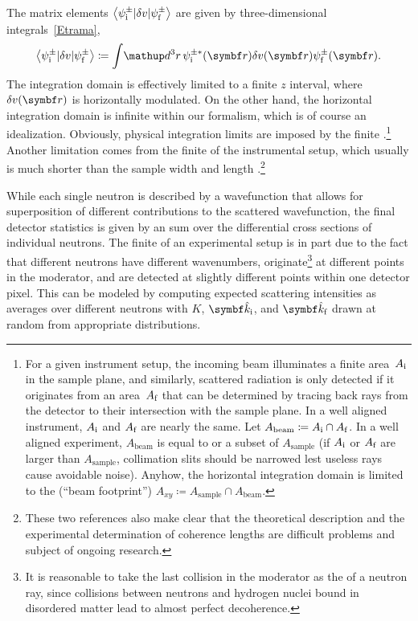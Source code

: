 %
The matrix elements $\left\langle \psi^\pm_{\text{i}}|\delta v|\psi^\pm_{\text{f}}\right\rangle$
are given by three-dimensional integrals~\cref{Etrama},
\begin{equation}\label{Etrama3}
  \bra \psi_\ti^\pm|\delta v|\psi_\tf^\pm\ket
  \coloneqq  \int\!\d^3r\, \psi^{\pm*}_\ti(\r)\delta v(\r)\psi^\pm_\tf(\r).
\end{equation}
The integration domain is effectively limited to a finite $z$ interval,
where $\delta v(\r)$ is horizontally modulated.
On the other hand, the horizontal integration domain is infinite
within our formalism,
which is of course an idealization.
Obviously, physical integration limits are imposed by the finite
.\footnote
{For a given instrument setup,
the incoming beam illuminates a finite area~$A_{\text{i}}$ in the sample plane,
and similarly, scattered radiation is only detected if it originates
from an area~$A_{\text{f}}$ that can be determined
by tracing back rays from the detector
to their intersection with the sample plane.
In a well aligned instrument, $A_{\text{i}}$ and $A_{\text{f}}$ are nearly the same.
Let $A_\text{beam}\coloneqq A_{\text{i}}\cap A_{\text{f}}$.
In a well aligned experiment,
$A_\text{beam}$ is equal to or a subset of $A_\text{sample}$
(if $A_{\text{i}}$ or $A_{\text{f}}$ are larger than $A_\text{sample}$,
collimation slits should be narrowed
lest useless rays cause avoidable noise).
Anyhow, the horizontal integration domain
is limited to the  (``beam footprint'')
$A_{xy}\coloneqq A_\text{sample}\cap A_\text{beam}$.}
%
%
%
Another limitation comes from the finite 
of the instrumental setup,
which usually is much shorter than the sample width and length
\cite{HaPR10,MaMM14}.\footnote
{These two references also make clear that
  the theoretical description and the experimental determination of
  coherence lengths are difficult problems and subject of ongoing research.}

While each single neutron is described by a wavefunction
that allows for  superposition of
different contributions to the scattered wavefunction,
the final detector statistics
%
is given by an  sum
over the differential cross sections of individual neutrons.
The finite 
%
of an experimental setup is in part due to the fact that
different neutrons have different wavenumbers,
originate\footnote
{It is reasonable to take the last collision in the moderator
  as the  of a neutron ray,
  since collisions between neutrons and hydrogen nuclei bound in
  disordered matter lead to almost perfect decoherence.}
at different points in the moderator,
and are detected at slightly different points within one detector pixel.
This can be modeled by computing expected scattering intensities as
averages over different neutrons with
$K$, $\v{\hat k}_\ti$, and $\v{\hat k}_\tf$ drawn at random
from appropriate distributions.

